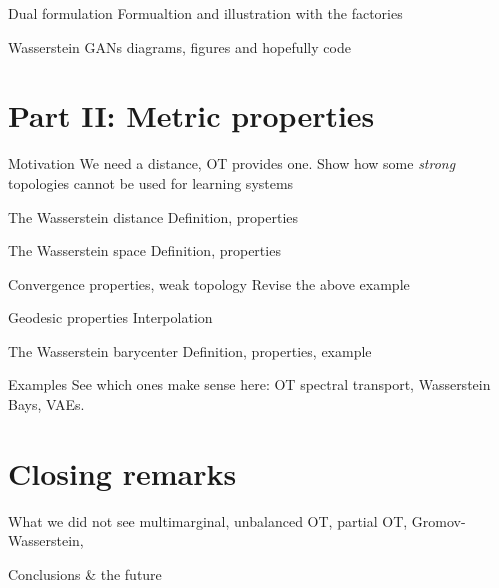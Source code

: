 \documentclass[pdf,aspectratio=169,10pt]{beamer}
\begin{document}
\begin{frame}{Dual formulation}
    Formualtion and illustration with the factories
\end{frame}

\begin{frame}{ Wasserstein GANs}
diagrams, figures and hopefully code
\end{frame}


\section{Part II: Metric properties}



\begin{frame}{Motivation}
    We need a distance, OT provides one. Show how some \emph{strong} topologies cannot be used for learning systems
\end{frame}

\begin{frame}{The Wasserstein distance}
    Definition, properties
\end{frame}

\begin{frame}{The Wasserstein space}
    Definition, properties
\end{frame}

\begin{frame}{Convergence properties, weak topology}
    Revise the above example
\end{frame}


\begin{frame}{Geodesic properties}
    Interpolation
\end{frame}

\begin{frame}{The Wasserstein barycenter}
    Definition, properties, example
\end{frame}


\begin{frame}{Examples}
    See which ones make sense here:  OT spectral transport, Wasserstein Bays, VAEs.
\end{frame}


\section{Closing remarks}

\begin{frame}{What we did not see}
   multimarginal, unbalanced OT, partial OT, Gromov-Wasserstein, 
\end{frame}


\begin{frame}{Conclusions \& the future}
\end{frame}






\begin{frame}[plain]
    \titlepage
\end{frame}
\end{document}
